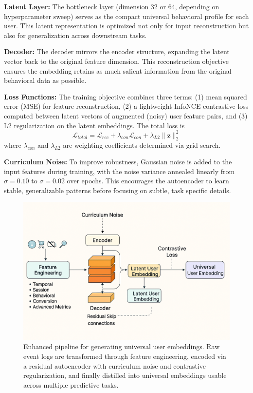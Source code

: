 \documentclass[sigconf]{acmart}
\begin{document}
\textbf{Latent Layer:}  
The bottleneck layer (dimension 32 or 64, depending on hyperparameter sweep) serves as the compact universal behavioral profile for each user. This latent representation is optimized not only for input reconstruction but also for generalization across downstream tasks.

\textbf{Decoder:}  
The decoder mirrors the encoder structure, expanding the latent vector back to the original feature dimension. This reconstruction objective ensures the embedding retains as much salient information from the original behavioral data as possible.

\textbf{Loss Functions:}  
The training objective combines three terms: (1) mean squared error (MSE) for feature reconstruction, (2) a lightweight InfoNCE contrastive loss computed between latent vectors of augmented (noisy) user feature pairs, and (3) L2 regularization on the latent embeddings. The total loss is  
\[
\mathcal{L}_{total} = \mathcal{L}_{rec} + \lambda_{con}\mathcal{L}_{con} + \lambda_{L2}\|\mathbf{z}\|_2^2
\]  
where $\lambda_{con}$ and $\lambda_{L2}$ are weighting coefficients determined via grid search.

\textbf{Curriculum Noise:}  
To improve robustness, Gaussian noise is added to the input features during training, with the noise variance annealed linearly from $\sigma=0.10$ to $\sigma=0.02$ over epochs. This encourages the autoencoder to learn stable, generalizable patterns before focusing on subtle, task specific details.

\begin{figure}[htb!]
  \centering
  \includegraphics[width=0.9\linewidth]{detail.png}
  \caption{Enhanced pipeline for generating universal user embeddings. Raw event logs are transformed through feature engineering, encoded via a residual autoencoder with curriculum noise and contrastive regularization, and finally distilled into universal embeddings usable across multiple predictive tasks.}
  \label{fig:architecture}
\end{figure}
\end{document}
